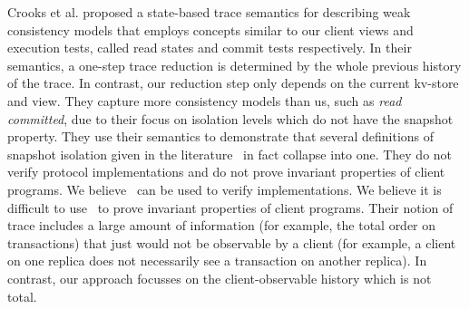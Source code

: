 {Crooks et al. \citet{seebelieve} proposed a state-based trace
semantics for describing weak consistency models that employs concepts
similar to our client views and execution tests, called read states and
commit tests respectively.  In their semantics, a one-step trace
reduction is determined by the whole previous history of the trace.
In contrast, our reduction step only depends on the current kv-store
and view.  They capture more consistency models than us, such as {\em
  read committed}, due to their focus on isolation levels which do not
have the snapshot property. They use their semantics to 
demonstrate that 
several definitions of snapshot isolation  given in the
literature~\cite{citations} in fact collapse into one.  They do not verify
protocol implementations and do not prove invariant properties of
client programs.  We believe~\cite{seebelieve} can be used to verify
implementations. We believe it is difficult to use~\cite{seebelieve}
to prove invariant properties of client programs.  Their notion of
trace includes a large amount of information (for example, the total
order on transactions) that just would not be observable by a
client (for example, a client on one replica does not necessarily see
a transaction on another replica).
In contrast, our  approach focusses on the client-observable history
which is not total. 





}
